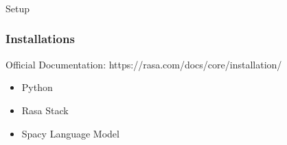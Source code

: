 
\begin{frame}[fragile]\frametitle{}
\begin{center}
{\Large Setup}


\end{center}
\end{frame}

 \begin{frame}[fragile]\frametitle{Installations}
Official Documentation: https://rasa.com/docs/core/installation/

\begin{itemize}
\item Python
\item Rasa Stack
\item Spacy Language Model
\end{itemize}

\end{frame}



